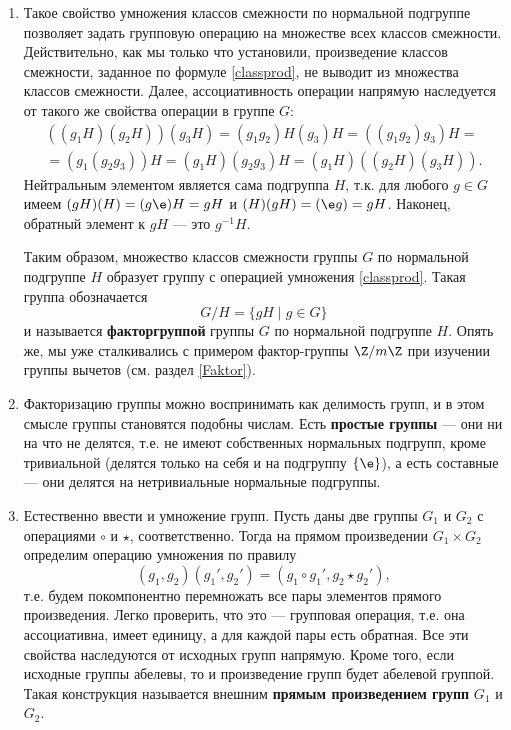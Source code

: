 \begin{enumerate}
\item Такое свойство умножения классов смежности по нормальной подгруппе позволяет задать групповую операцию на множестве всех классов смежности. Действительно, как мы только что установили, произведение классов смежности, заданное по формуле \eqref{classprod}, не выводит из множества классов смежности. Далее, ассоциативность операции напрямую наследуется от такого же свойства операции в группе $G$:
\begin{multline*}
((g_1H)(g_2H))(g_3H)=(g_1g_2)H(g_3)H=((g_1g_2)g_3)H=\\ 
=(g_1(g_2g_3))H=(g_1H)(g_2g_3)H = (g_1H)((g_2H)(g_3H)).
\end{multline*}
Нейтральным элементом является сама подгруппа $H$, т.к. для любого $g\in G$ имеем $(gH)(H)=(g\e)H=gH$ и $(H)(gH)=(\e g)=gH$. Наконец, обратный элемент к $gH$ --- это $g^{-1}H$.

Таким образом, множество классов смежности группы $G$ по нормальной подгруппе $H$ образует группу с операцией умножения \eqref{classprod}. Такая группа обозначается
$$
G/H = \{gH\mid g\in G\}
$$
и называется \textbf{факторгруппой} группы $G$ по нормальной подгруппе $H$. Опять же, мы уже сталкивались с примером фактор-группы $\Z/m\Z$ при изучении группы вычетов (см. раздел \ref{Faktor}).

\item Факторизацию группы можно воспринимать как делимость групп, и в этом смысле группы становятся подобны числам. Есть \textbf{простые группы} --- они ни на что не делятся, т.е. не имеют собственных нормальных подгрупп, кроме тривиальной (делятся только на себя и на подгруппу $\{\e\}$), а есть составные --- они делятся на нетривиальные нормальные подгруппы.

\item Естественно ввести и умножение групп. Пусть даны две группы $G_1$ и $G_2$ с операциями $\circ$ и $\star$, соответственно. Тогда на прямом произведении $G_1\times G_2$ определим операцию умножения по правилу
$$
(g_1,g_2)(g_1',g_2') = (g_1\circ g_1', g_2\star g_2'),
$$
т.е. будем покомпонентно перемножать все пары элементов прямого произведения. Легко проверить, что это --- групповая операция, т.е. она ассоциативна, имеет единицу, а для каждой пары есть обратная. Все эти свойства наследуются от исходных групп напрямую. Кроме того, если исходные группы абелевы, то и произведение групп будет абелевой группой. Такая конструкция называется внешним \textbf{прямым произведением групп} $G_1$ и $G_2$.


\end{enumerate}
